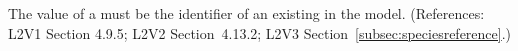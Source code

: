 The value of a \SpeciesReference {}  must be the
identifier of an existing \Species in the model.  (References: L2V1 Section
4.9.5; L2V2 Section~4.13.2; L2V3 Section~\ref{subsec:speciesreference}.)
